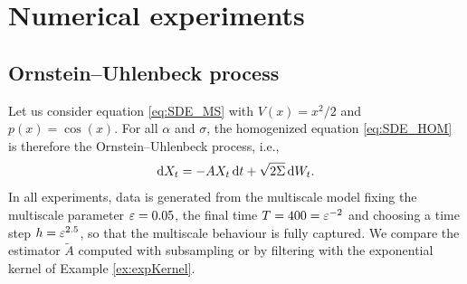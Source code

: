 \documentclass[10pt]{article}
\begin{document}
\section{Numerical experiments}

\subsection{Ornstein--Uhlenbeck process}

Let us consider equation \ref{eq:SDE_MS} with $V(x) = x^2 / 2$ and $p(x) = \cos(x)$. For all $\alpha$ and $\sigma$, the homogenized equation \eqref{eq:SDE_HOM} is therefore the Ornstein--Uhlenbeck process, i.e.,
\begin{equation}
	\mathrm{d} X_t = -A X_t \,\mathrm{d} t + \sqrt{2\Sigma} \,\mathrm{d} W_t.
\end{equation}
In all experiments, data is generated from the multiscale model fixing the multiscale parameter $\varepsilon = 0.05$, the final time $T = 400 = \varepsilon^{-2}$ and choosing a time step $h = \varepsilon^{2.5}$, so that the multiscale behaviour is fully captured. We compare the estimator $\widetilde A$ computed with subsampling or by filtering with the exponential kernel of Example \ref{ex:expKernel}. 
\end{document}
